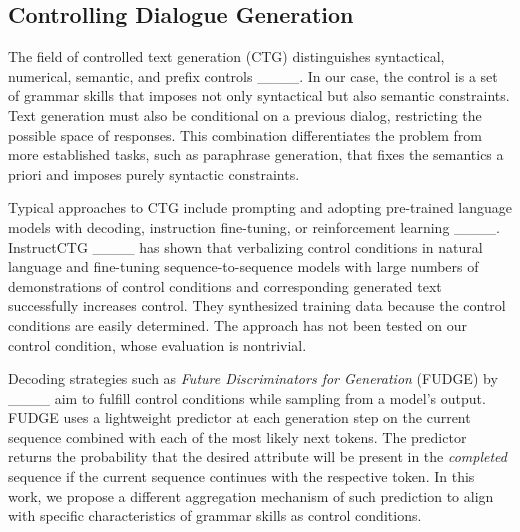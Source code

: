 \subsection{Controlling Dialogue Generation}
The field of controlled text generation (CTG) distinguishes syntactical, numerical, semantic, and prefix controls ____. In our case, the control is a set of grammar skills that imposes not only syntactical but also semantic constraints. Text generation must also be conditional on a previous dialog, restricting the possible space of responses. This combination differentiates the problem from more established tasks, such as paraphrase generation, that fixes the semantics a priori and imposes purely syntactic constraints. 

Typical approaches to CTG include prompting and adopting pre-trained language models with decoding, instruction fine-tuning, or reinforcement learning ____. %
InstructCTG ____ has shown that verbalizing control conditions in natural language and fine-tuning sequence-to-sequence models with large numbers of demonstrations of control conditions and corresponding generated text successfully increases control. They synthesized training data because the control conditions are easily determined. The approach has not been tested on our control condition, whose evaluation is nontrivial.

Decoding strategies such as \textit{Future Discriminators for Generation} (FUDGE) by ____ aim to fulfill control conditions while sampling from a model's output. FUDGE uses a lightweight predictor at each generation step on the current sequence combined with each of the most likely next tokens. The predictor returns the probability that the desired attribute will be present in the \textit{completed} sequence if the current sequence continues with the respective token. In this work, we propose a different aggregation mechanism of such prediction to align with specific characteristics of grammar skills as control conditions.